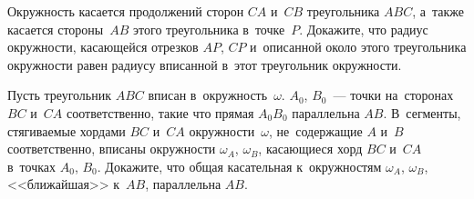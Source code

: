 \begin{problems}

\item
Окружность касается продолжений сторон $CA$ и~$CB$ треугольника $ABC$, а~также
касается стороны~$AB$ этого треугольника в~точке~$P$.
Докажите, что радиус окружности, касающейся отрезков $AP$, $CP$ и~описанной
около этого треугольника окружности равен радиусу вписанной в~этот треугольник
окружности.

\item
Пусть треугольник $ABC$ вписан в~окружность~$\omega$.
$A_0$, $B_0$~--- точки на~сторонах $BC$ и~$CA$ соответственно, такие что прямая
$A_0 B_0$ параллельна $AB$.
В~сегменты, стягиваемые хордами $BC$ и~$CA$ окружности~$\omega$, не~содержащие
$A$ и~$B$ соответственно, вписаны окружности $\omega_A$, $\omega_B$, касающиеся
хорд $BC$ и~$CA$ в~точках $A_0$, $B_0$.
Докажите, что общая касательная к~окружностям $\omega_A$, $\omega_B$,
<<ближайшая>> к~$AB$, параллельна $AB$.

\end{problems}

